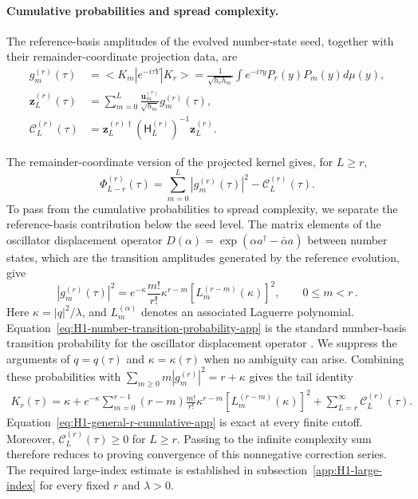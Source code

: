 \documentclass[a4paper,11pt]{article}
\def\ket#1{|#1>}%
\def\bra#1{<#1|}%
\def\dd{d}%
\def\ii{i}%
\def\ee{e}%
\theoremstyle{definition}
\theoremstyle{remark}
\newcommand{\ket}[1]{|#1\rangle}
\newcommand{\bra}[1]{\langle #1|}
\newcommand{\dd}{\mathrm d}
\newcommand{\ii}{\mathrm i}
\newcommand{\ee}{\mathrm e}
\begin{document}
\paragraph{Cumulative probabilities and spread complexity.}
The reference-basis amplitudes of the evolved number-state seed, together with their remainder-coordinate projection data, are 
\begin{equation}
\begin{aligned}
   g_m^{(r)}(\tau)
   &=\bra{K_m}\ee^{-\ii\tau Y}\ket{K_r}
   =\frac{1}{\sqrt{h_rh_m}}\int
   \ee^{-\ii\tau y}P_r(y)P_m(y)\dd\mu(y),\\
   \mathbf z_L^{(r)}(\tau)
   &=\sum_{m=0}^{L}
   \frac{\mathbf u_m^{(r)}}{\sqrt{h_m}}g_m^{(r)}(\tau), \\
   \mathcal C_L^{(r)}(\tau)&=
   \mathbf z_L^{(r)\dagger}
   (\mathsf H_L^{(r)})^{-1}\mathbf z_L^{(r)}.
\end{aligned}
   \label{eq:H1-general-r-z-app}
\end{equation}

The remainder-coordinate version of the projected kernel gives, for $L\ge r$,
\begin{equation}
   \Phi_{L-r}^{(r)}(\tau)
   =\sum_{m=0}^{L}|g_m^{(r)}(\tau)|^2-\mathcal C_L^{(r)}(\tau).
   \label{eq:H1-general-r-cumulative-app}
\end{equation}
To pass from the cumulative probabilities to spread complexity, we separate the reference-basis contribution below the seed level. The matrix elements of the oscillator displacement operator $D(\alpha)=\exp(\alpha a^\dagger-\bar\alpha a)$ between number states, which are the transition amplitudes generated by the reference evolution, give 
\begin{equation}
   |g_m^{(r)}(\tau)|^2=
   \ee^{-\kappa}\frac{m!}{r!}\kappa^{r-m}
   \left[L_m^{(r-m)}(\kappa)\right]^2,
   \qquad 0\le m<r\,.
   \label{eq:H1-number-transition-probability-app}
\end{equation}
Here $\kappa=|q|^2/\lambda$, and $L_m^{(\alpha)}$ denotes an associated Laguerre polynomial. Equation~\eqref{eq:H1-number-transition-probability-app} is the standard number-basis transition probability for the oscillator displacement operator \cite{Perelomov1986}. We suppress the arguments of $q=q(\tau)$ and $\kappa=\kappa(\tau)$ when no ambiguity can arise. Combining these probabilities with $\sum_{m\ge0}m|g_m^{(r)}|^2=r+\kappa$ gives the tail identity 
\begin{equation}
\begin{aligned}
   K_r(\tau)=
   \kappa+\ee^{-\kappa}
   \sum_{m=0}^{r-1}(r-m)\frac{m!}{r!}\kappa^{r-m}
   \left[L_m^{(r-m)}(\kappa)\right]^2
   +\sum_{L=r}^{\infty}\mathcal C_L^{(r)}(\tau).
\end{aligned}
   \label{eq:H1-general-r-complexity-app}
\end{equation}
Equation~\eqref{eq:H1-general-r-cumulative-app} is exact at every finite cutoff. Moreover, $\mathcal C_L^{(r)}(\tau)\ge0$ for $L\ge r$. Passing to the infinite complexity sum therefore reduces to proving convergence of this nonnegative correction series. The required large-index estimate is established in subsection~\ref{app:H1-large-index} for every fixed $r$ and $\lambda>0$.
\end{document}
